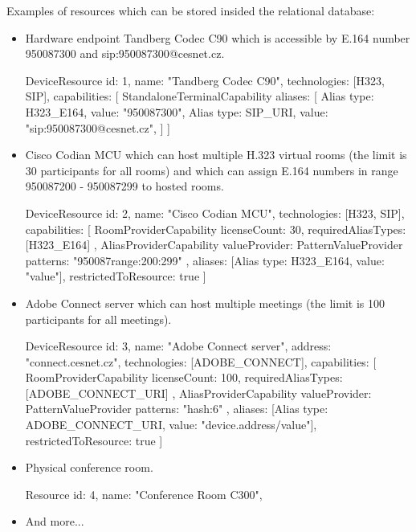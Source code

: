 Examples of resources which can be stored insided the relational database:

\begin{itemize}

\item Hardware endpoint Tandberg Codec C90 which is accessible by E.164 number 950087300 and sip:950087300@cesnet.cz.
\begin{Entity}
DeviceResource {
  id: 1,
  name: "Tandberg Codec C90",
  technologies: [H323, SIP],
  capabilities: [
    StandaloneTerminalCapability {
      aliases: [
        Alias { type: H323_E164, value: "950087300"},
        Alias { type: SIP_URI,   value: "sip:950087300@cesnet.cz"},  	  	
      ]
    }
  ] 
}
\end{Entity}

\newpage
\item Cisco Codian MCU which can host multiple H.323 virtual rooms (the limit is 30 participants for all rooms) and which can assign E.164 numbers in range 950087200 - 950087299 to hosted rooms.
\begin{Entity}
DeviceResource {
  id: 2,
  name: "Cisco Codian MCU",
  technologies: [H323, SIP],
  capabilities: [
    RoomProviderCapability {
      licenseCount: 30,
      requiredAliasTypes: [H323_E164]
    },
    AliasProviderCapability {
      valueProvider: PatternValueProvider {
        patterns: "950087{range:200:299}"
      },
      aliases: [Alias { type: H323_E164, value: "{value}"}],
      restrictedToResource: true 
    }
  ]
}
\end{Entity}

\item Adobe Connect server which can host multiple meetings (the limit is 100 participants for all meetings).
\begin{Entity}
DeviceResource {
  id: 3,
  name: "Adobe Connect server",
  address: "connect.cesnet.cz",
  technologies: [ADOBE_CONNECT],
  capabilities: [
    RoomProviderCapability {
      licenseCount: 100,
      requiredAliasTypes: [ADOBE_CONNECT_URI]
    },
    AliasProviderCapability {
      valueProvider: PatternValueProvider {
        patterns: "{hash:6}"
      },
      aliases: [Alias { type: ADOBE_CONNECT_URI, value: "{device.address}/{value}"}],
      restrictedToResource: true 
    }
  ]
}
\end{Entity}

\item Physical conference room.

\begin{Entity}
Resource {
  id: 4,
  name: "Conference Room C300",
}
\end{Entity}

\item And more...

\end{itemize}



